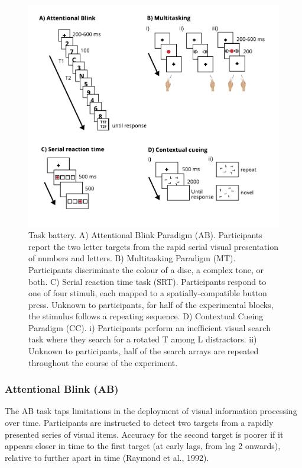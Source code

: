 \documentclass[
  man]{apa6}
\begin{document}
\begin{figure}

{\centering \includegraphics[width=0.7\linewidth]{../images/FigXXXX_alltasks} 

}

\caption{Task battery. A) Attentional Blink Paradigm (AB). Participants report the two letter targets from the rapid serial visual presentation of numbers and letters. B) Multitasking Paradigm (MT). Participants discriminate the colour of a disc, a complex tone, or both. C) Serial reaction time task (SRT). Participants respond to one of four stimuli, each mapped to a spatially-compatible button press. Unknown to participants, for half of the experimental blocks, the stimulus follows a repeating sequence. D) Contextual Cueing Paradigm (CC). i) Participants perform an inefficient visual search task where they search for a rotated T among L distractors. ii) Unknown to participants, half of the search arrays are repeated throughout the course of the experiment. }\label{fig:FigureParadigm}
\end{figure}

\hypertarget{attentional-blink-ab}{%
\subsubsection{Attentional Blink (AB)}\label{attentional-blink-ab}}

\label{sec:ABMeth}

The AB task taps limitations in the deployment of visual information processing over time. Participants are instructed to detect two targets from a rapidly presented series of visual items. Accuracy for the second target is poorer if it appears closer in time to the first target (at early lags, from lag 2 onwards), relative to further apart in time (Raymond et al., 1992).
\end{document}
